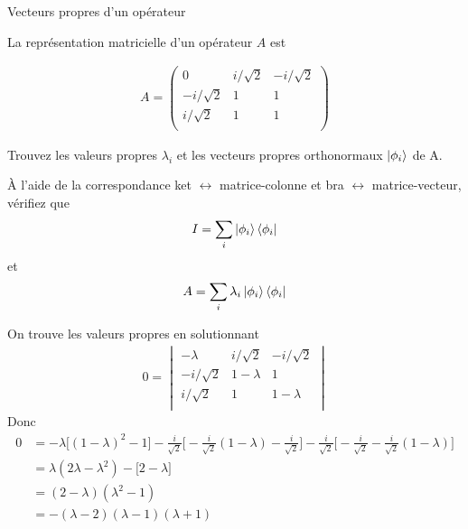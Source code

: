 \documentclass[12pt,solution=false]{uqtrassignment}
\begin{document}
\begin{problem}{Vecteurs propres d'un opérateur} %

La représentation matricielle d'un opérateur $A$ est

\begin{align}
  A = \begin{pmatrix}
    0   &  i / \sqrt{2}  & -i/\sqrt{2}\\
    -i/\sqrt{2}   &   1  & 1\\
     i/\sqrt{2}   &   1  & 1\\
  \end{pmatrix}
\end{align}

\subproblem
Trouvez les valeurs propres $\lambda_i$
  et les vecteurs propres orthonormaux $\ket{\phi_i}$ de A.

\subproblem
À l'aide de la correspondance ket $\leftrightarrow$ matrice-colonne
  et bra $\leftrightarrow$ matrice-vecteur,
  vérifiez que
\begin{align}
  I = \sum_i \ket{\phi_i} \bra{\phi_i}
\end{align}
et
\begin{align}
  A = \sum_i \lambda_i \ket{\phi_i} \bra{\phi_i}
\end{align}

\begin{solution}

\subproblem
On trouve les valeurs propres en solutionnant
\begin{align}
  0 = \begin{vmatrix}
    -\lambda   &  i / \sqrt{2}  & -i/\sqrt{2}\\
    -i/\sqrt{2}   &   1-\lambda  & 1\\
     i/\sqrt{2}   &   1  & 1-\lambda\\
  \end{vmatrix}
\end{align}
Donc
\begin{align}
  0 &=
  -\lambda \big[ (1-\lambda)^2 - 1 \big]
  - \frac{i}{\sqrt{2}}
    \bigg[
      -\frac{i}{\sqrt{2}} (1-\lambda) - \frac{i}{\sqrt{2}}
    \bigg]
  - \frac{i}{\sqrt{2}}
    \bigg[
      - \frac{i}{\sqrt{2}}
      -\frac{i}{\sqrt{2}} (1-\lambda)
    \bigg]\\
  & =
  \lambda (  2\lambda - \lambda^2)
  - \big[ 2 - \lambda \big]\\
  & =
  (2 - \lambda) (\lambda^2 - 1)\\
  & =
  -(\lambda - 2) (\lambda - 1) (\lambda + 1)
\end{align}


\end{solution}
\end{problem}
\end{document}
